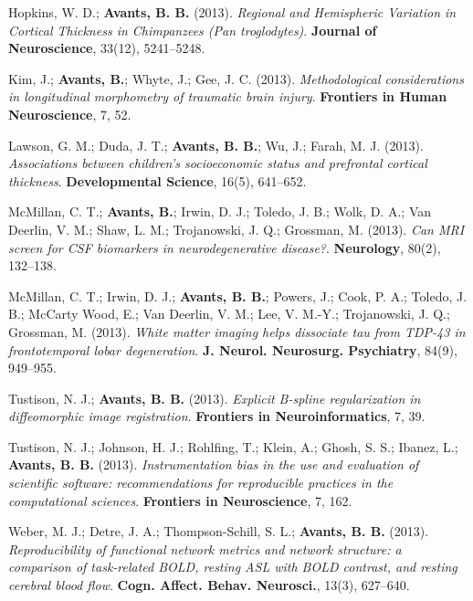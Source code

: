 \documentclass[10pt,letterpaper]{article}
\begin{document}
\begin{enumerate}
{  %
  \item Hopkins, W. D.; \textbf{Avants, B. B.} (2013). \textit{Regional and Hemispheric Variation in Cortical Thickness in Chimpanzees (Pan troglodytes)}. \textbf{Journal of Neuroscience}, 33(12), 5241--5248.
  \item Kim, J.; \textbf{Avants, B.}; Whyte, J.; Gee, J. C. (2013). \textit{Methodological considerations in longitudinal morphometry of traumatic brain injury}. \textbf{Frontiers in Human Neuroscience}, 7, 52.
  \item Lawson, G. M.; Duda, J. T.; \textbf{Avants, B. B.}; Wu, J.; Farah, M. J. (2013). \textit{Associations between children's socioeconomic status and prefrontal cortical thickness}. \textbf{Developmental Science}, 16(5), 641--652.
  \item McMillan, C. T.; \textbf{Avants, B.}; Irwin, D. J.; Toledo, J. B.; Wolk, D. A.; Van Deerlin, V. M.; Shaw, L. M.; Trojanowski, J. Q.; Grossman, M. (2013). \textit{Can MRI screen for CSF biomarkers in neurodegenerative disease?}. \textbf{Neurology}, 80(2), 132--138.
  \item McMillan, C. T.; Irwin, D. J.; \textbf{Avants, B. B.}; Powers, J.; Cook, P. A.; Toledo, J. B.; McCarty Wood, E.; Van Deerlin, V. M.; Lee, V. M.-Y.; Trojanowski, J. Q.; Grossman, M. (2013). \textit{White matter imaging helps dissociate tau from TDP-43 in frontotemporal lobar degeneration}. \textbf{J. Neurol. Neurosurg. Psychiatry}, 84(9), 949--955.
  \item Tustison, N. J.; \textbf{Avants, B. B.} (2013). \textit{Explicit B-spline regularization in diffeomorphic image registration}. \textbf{Frontiers in Neuroinformatics}, 7, 39.
  \item Tustison, N. J.; Johnson, H. J.; Rohlfing, T.; Klein, A.; Ghosh, S. S.; Ibanez, L.; \textbf{Avants, B. B.} (2013). \textit{Instrumentation bias in the use and evaluation of scientific software: recommendations for reproducible practices in the computational sciences}. \textbf{Frontiers in Neuroscience}, 7, 162.
  \item Weber, M. J.; Detre, J. A.; Thompson-Schill, S. L.; \textbf{Avants, B. B.} (2013). \textit{Reproducibility of functional network metrics and network structure: a comparison of task-related BOLD, resting ASL with BOLD contrast, and resting cerebral blood flow}. \textbf{Cogn. Affect. Behav. Neurosci.}, 13(3), 627--640.

}
\end{enumerate}
\end{document}
